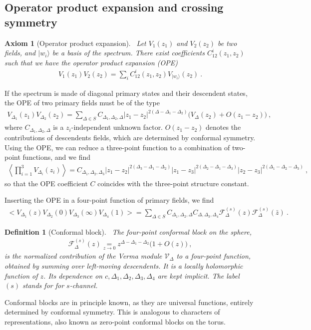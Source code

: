 \documentclass[12pt, a4paper]{article}
\theoremstyle{break}
\newtheorem{hyp}[exo]{Axiom}
\newtheorem{defn}[exo]{Definition}
\begin{document}
\subsection{Operator product expansion and crossing symmetry}

\begin{hyp}[Operator product expansion]
 ~\label{hyp:ope}
 Let $V_1(z_1)$ and $V_2(z_2)$ be two fields, and $|w_i\rangle$ be a basis of the spectrum.
 There exist coefficients $C^i_{12}(z_1,z_2)$ such that we have the operator product expansion (OPE) 
 \begin{align}
  V_1(z_1)V_2(z_2) = \sum_i C^i_{12}(z_1,z_2) V_{|w_i\rangle}(z_2)\ .
 \end{align}
\end{hyp}
If the spectrum is made of diagonal primary states and their descendent states, the OPE of two primary fields must be of the type
\begin{align}
 V_{\Delta_1}(z_1) V_{\Delta_2}(z_2) 
 = \sum_{\Delta\in S} C_{\Delta_1,\Delta_2,\Delta} |z_1-z_2|^{2(\Delta-\Delta_1-\Delta_2)}
 \Big(V_{\Delta}(z_2) + O(z_1-z_2) \Big)\ ,
 \label{eq:ope}
\end{align}
where $C_{\Delta_1,\Delta_2,\Delta}$ is a $z_i$-independent unknown factor. 
$O(z_1-z_2)$ denotes the contributions of descendents fields, which are determined by conformal symmetry.
Using the OPE, we can reduce a three-point function to a combination of two-point functions, and we find 
\begin{align}
 \left<\prod_{i=1}^3 V_{\Delta_i}(z_i) \right> = C_{\Delta_1,\Delta_2,\Delta_3} |z_1-z_2|^{2(\Delta_3-\Delta_1-\Delta_2)} |z_1-z_3|^{2(\Delta_2-\Delta_1-\Delta_3)} |z_2-z_3|^{2(\Delta_1-\Delta_2-\Delta_3)}\ ,
\end{align}
so that the OPE coefficient $C$ coincides with the three-point structure constant.

Inserting the OPE in a four-point function of primary fields, we find
\begin{align}
\Big<V_{\Delta_1}(z)V_{\Delta_2}(0)V_{\Delta_3}(\infty)V_{\Delta_4}(1)\Big>
 =\sum_{\Delta\in S} C_{\Delta_1,\Delta_2,\Delta} C_{\Delta,\Delta_3,\Delta_4}  \mathcal{F}^{(s)}_\Delta(z) \mathcal{F}^{(s)}_\Delta(\bar z)\ .
 \label{sdec}
\end{align}

\begin{defn}[Conformal block]
 ~\label{def:block}
 The four-point conformal block on the sphere,
 \begin{align}
  \mathcal{F}^{(s)}_\Delta(z) \underset{z\to 0}{=} z^{\Delta-\Delta_1-\Delta_2}\Big( 1 + O(z) \Big)\ ,
  \label{eq:gsd}
 \end{align}
is the normalized contribution of the Verma module $\mathcal V_\Delta$ to a four-point function, obtained by summing over left-moving descendents. It is a locally holomorphic function of $z$. Its dependence on $c,\Delta_1,\Delta_2,\Delta_3,\Delta_4$ are kept implicit. The label $(s)$ stands for for $s$-channel.
\end{defn}
Conformal blocks are in principle known, as they are universal functions, entirely determined by conformal symmetry. This is analogous to characters of representations, also known as zero-point conformal blocks on the torus.
\end{document}

